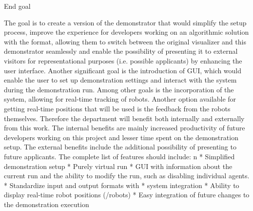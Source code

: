 \sec End goal

The goal is to create a version of the demonstrator that would simplify the setup process, improve the experience for developers working on an algorithmic solution with the {\mapfIR} format, allowing them to switch between the original visualizer and this demonstrator seamlessly and enable the possibility of presenting it to external visitors for representational purposes (i.e. possible applicants) by enhancing the user interface.\br
Another significant goal is the introduction of GUI, which would enable the user to set up demonstration settings and interact with the system during the demonstration run.
Among other goals is the incorporation of the {\vicon} system, allowing for real-time tracking of robots. Another option available for getting real-time positions that will be used is the feedback from the robots themselves.\br
\br
Therefore the department will benefit both internally and externally from this work. The internal benefits are mainly increased productivity of future developers working on this project and lesser time spent on the demonstration setup. The external benefits include the additional possibility of presenting to future applicants.
The complete list of features should include:
\begitems \style n
    * Simplified demonstration setup
    * Purely virtual run
    * GUI with information about the current run and the ability to modify the run, such as disabling individual agents. 
    * Standardize input and output formats with \mapfIR
    * {\vicon} system integration
    * Ability to display real-time robot positions ({\vicon}/robots)
    * Easy integration of future changes to the demonstration execution
\enditems